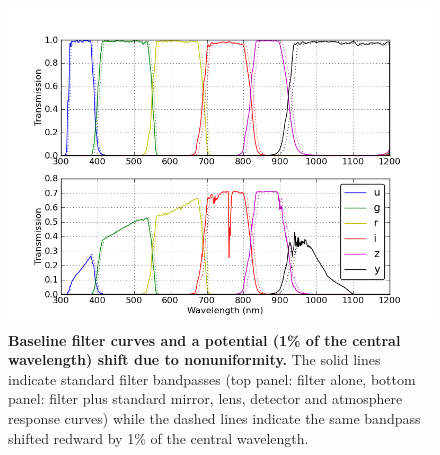 \documentclass[12pt,preprint]{aastex}
\begin{document}
\begin{figure}
\centering
\includegraphics[width=6in]{filter_shifts}
\caption{{\small 
{\bf Baseline filter curves and a potential (1\% of the central
  wavelength) shift due to nonuniformity.}
The solid lines indicate standard filter bandpasses (top panel: filter
alone, bottom panel: filter plus standard mirror, lens, detector and atmosphere
response curves) while the dashed lines indicate the same bandpass
shifted redward by 1\% of the central wavelength.}}
\label{fig:filtershift}
\end{figure}
\end{document}
